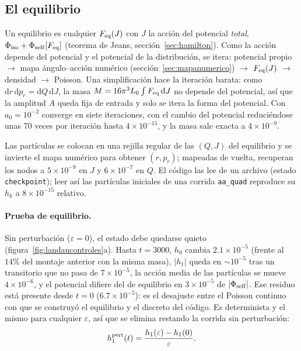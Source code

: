 \documentclass[11pt,a4paper]{article}
\newcommand{\dd}{\mathrm{d}}
\newcommand{\rp}{p_r}
\newcommand{\Jr}{J}
\newcommand{\Qr}{Q}
\theoremstyle{definition}
\begin{document}
\subsection{El equilibrio}

Un equilibrio es cualquier $F_{\rm eq}(\Jr)$ con $\Jr$ la acción del potencial
\emph{total}, $\Phi_{\rm iso}+\Phi_{\rm self}[F_{\rm eq}]$ (teorema de Jeans,
sección~\ref{sec:hamilton}). Como la acción depende del potencial y el potencial de la
distribución, se itera: potencial propio $\to$ mapa ángulo--acción numérico
(sección~\ref{sec:mapanumerico}) $\to$ $F_{\rm eq}(\Jr)$ $\to$ densidad $\to$ Poisson.
Una simplificación hace la iteración barata: como $\dd r\,\dd\rp=\dd\Qr\,\dd\Jr$, la masa
$M=16\pi^3L_0\int F_{\rm eq}\,\dd\Jr$ no depende del potencial, así que la amplitud $A$
queda fija de entrada y solo se itera la forma del potencial. Con $a_0=10^{-2}$ converge
en siete iteraciones, con el cambio del potencial reduciéndose unas 70 veces por
iteración hasta $4\times10^{-15}$, y la masa sale exacta a $4\times10^{-9}$.

Las partículas se colocan en una rejilla regular de las $(\Qr,\Jr)$ del equilibrio y se
invierte el mapa numérico para obtener $(r,\rp)$; mapeadas de vuelta, recuperan los
nodos a $5\times10^{-9}$ en $\Jr$ y $6\times10^{-7}$ en $\Qr$. El código las lee de un
archivo (estado \texttt{checkpoint}); leer así las partículas iniciales de una corrida
\texttt{aa\_quad} reproduce su $h_k$ a $8\times10^{-15}$ relativo.

\paragraph{Prueba de equilibrio.} Sin perturbación ($\varepsilon=0$), el estado debe
quedarse quieto (figura~\ref{fig:landaucontroles}a). Hasta $t=3000$, $h_0$ cambia
$2.1\times10^{-5}$ (frente al $14\%$ del montaje anterior con la misma masa), $|h_1|$ queda
en $\sim10^{-5}$ tras un transitorio que no pasa de $7\times10^{-5}$, la acción media de
las partículas se mueve $4\times10^{-6}$, y el potencial difiere del de equilibrio en
$3\times10^{-5}$ de $|\Phi_{\rm self}|$. Ese residuo está presente desde $t=0$
($6.7\times10^{-5}$): es el desajuste entre el Poisson continuo con que se construyó el
equilibrio y el discreto del código. Es determinista y el mismo para cualquier
$\varepsilon$, así que se elimina restando la corrida sin perturbación:
\begin{equation}
  h_1^{\rm pert}(t)=\frac{h_1(\varepsilon)-h_1(0)}{\varepsilon}.
\end{equation}
\end{document}
